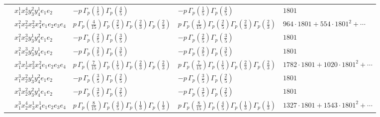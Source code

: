 \documentclass[11pt]{article}
\begin{document}
\begin{table}[ht]
{\begin{tabular}{@{}lllll@{}}
 & $x_{1}^{1} x_{2}^{4} y_{3}^{2} y_{4}^{1} e_{1} e_{2}$ & $- p \, \Gamma_p \left( \frac{1}{5} \right) \Gamma_p \left( \frac{4}{5} \right)$ & $- p \, \Gamma_p \left( \frac{1}{5} \right) \Gamma_p \left( \frac{4}{5} \right)$ & $1801$ \\
 & $x_{1}^{2} x_{2}^{2} x_{3}^{2} x_{4}^{2}  e_{1} e_{2} e_{3} e_{4}$ & $p \, \Gamma_p \left( \frac{4}{15} \right) \Gamma_p \left( \frac{2}{5} \right) \Gamma_p \left( \frac{2}{3} \right) \Gamma_p \left( \frac{2}{3} \right)$ & $p \, \Gamma_p \left( \frac{4}{15} \right) \Gamma_p \left( \frac{2}{5} \right) \Gamma_p \left( \frac{2}{3} \right) \Gamma_p \left( \frac{2}{3} \right)$ & $964{\cdot}1801{+}554{\cdot}1801^{2}{+}\cdots$ \\
 & $x_{1}^{2} x_{2}^{3} y_{3}^{1} y_{4}^{2} e_{1} e_{2}$ & $- p \, \Gamma_p \left( \frac{2}{5} \right) \Gamma_p \left( \frac{3}{5} \right)$ & $- p \, \Gamma_p \left( \frac{2}{5} \right) \Gamma_p \left( \frac{3}{5} \right)$ & $1801$ \\
 & $x_{1}^{2} x_{2}^{3} y_{3}^{2} y_{4}^{1} e_{1} e_{2}$ & $- p \, \Gamma_p \left( \frac{2}{5} \right) \Gamma_p \left( \frac{3}{5} \right)$ & $- p \, \Gamma_p \left( \frac{2}{5} \right) \Gamma_p \left( \frac{3}{5} \right)$ & $1801$ \\
 & $x_{1}^{3} x_{2}^{1} x_{3}^{2} x_{4}^{2}  e_{1} e_{2} e_{3} e_{4}$ & $p \, \Gamma_p \left( \frac{7}{15} \right) \Gamma_p \left( \frac{1}{5} \right) \Gamma_p \left( \frac{2}{3} \right) \Gamma_p \left( \frac{2}{3} \right)$ & $p \, \Gamma_p \left( \frac{7}{15} \right) \Gamma_p \left( \frac{1}{5} \right) \Gamma_p \left( \frac{2}{3} \right) \Gamma_p \left( \frac{2}{3} \right)$ & $1782{\cdot}1801{+}1020{\cdot}1801^{2}{+}\cdots$ \\
 & $x_{1}^{3} x_{2}^{2} y_{3}^{1} y_{4}^{2} e_{1} e_{2}$ & $- p \, \Gamma_p \left( \frac{3}{5} \right) \Gamma_p \left( \frac{2}{5} \right)$ & $- p \, \Gamma_p \left( \frac{3}{5} \right) \Gamma_p \left( \frac{2}{5} \right)$ & $1801$ \\
 & $x_{1}^{3} x_{2}^{2} y_{3}^{2} y_{4}^{1} e_{1} e_{2}$ & $- p \, \Gamma_p \left( \frac{3}{5} \right) \Gamma_p \left( \frac{2}{5} \right)$ & $- p \, \Gamma_p \left( \frac{3}{5} \right) \Gamma_p \left( \frac{2}{5} \right)$ & $1801$ \\
 & $x_{1}^{3} x_{2}^{4} x_{3}^{1} x_{4}^{1}  e_{1} e_{2} e_{3} e_{4}$ & $p \, \Gamma_p \left( \frac{8}{15} \right) \Gamma_p \left( \frac{4}{5} \right) \Gamma_p \left( \frac{1}{3} \right) \Gamma_p \left( \frac{1}{3} \right)$ & $p \, \Gamma_p \left( \frac{8}{15} \right) \Gamma_p \left( \frac{4}{5} \right) \Gamma_p \left( \frac{1}{3} \right) \Gamma_p \left( \frac{1}{3} \right)$ & $1327{\cdot}1801{+}1543{\cdot}1801^{2}{+}\cdots$ \\

\end{tabular}}
\end{table}
\end{document}
